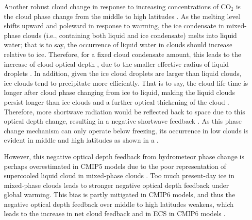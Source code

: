 Another robust cloud change in response to increasing concentrations of CO$_2$ is the cloud phase change from the middle to high latitudes \citep[e.g.,][]{Storelvmo2015cloud,Ceppi2016mechanisms,Tan2016observational,McCoy2016relationships}. As the melting level shifts upward and poleward in response to warming, the ice condensate in mixed-phase clouds (i.e., containing both liquid and ice condensate) melts into liquid water; that is to say, the occurrence of liquid water in clouds should increase relative to ice. Therefore, for a fixed cloud condensate amount, this leads to the increase of cloud optical depth \citep{Stephens1978radiation}, due to the smaller effective radius of liquid droplets \citep{Stubenrauch2013}. In addition, given the ice cloud droplets are larger than liquid clouds, ice clouds tend to precipitate more efficiently. That is to say, the cloud life time is longer after cloud phase changing from ice to liquid, making the liquid clouds persist longer than ice clouds and a further optical thickening of the cloud \citep{Storelvmo2015cloud,Ceppi2016mechanisms}. Therefore, more shortwave radiation would be reflected back to space due to this optical depth change, resulting in a negative shortwave feedback \citep[e.g.,][]{Zelinka2012computing1,Zelinka2012computing2,Zelinka2013contributions,Ceppi2016mechanisms,Tan2016observational,McCoy2016relationships,Zelinka2020causes,Bjordal2020equilibrium}. As this phase change mechanism can only operate below freezing, its occurrence in low clouds is evident in middle and high latitudes as shown in a \citep{Ceppi2017}. 


However, this negative optical depth feedback from hydrometeor phase change is perhaps overestimated in CMIP5 models due to the poor representation of supercooled liquid cloud in mixed-phase clouds \citep{Tan2016observational,Frey2018influence}. Too much present-day ice in mixed-phase clouds leads to stronger negative optical depth feedback under global warming. This bias is partly mitigated in CMIP6 models, and thus the negative optical depth feedback over middle to high latitudes weakens, which leads to the increase in net cloud feedback and in ECS in CMIP6 models \citep[e.g.,][]{Zelinka2020causes,Bjordal2020equilibrium}.


